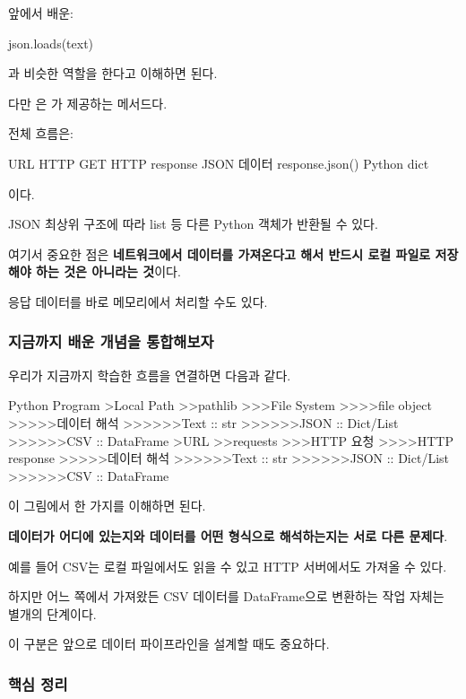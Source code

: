 앞에서 배운:

\begin{dhkcode}
json.loads(text)
\end{dhkcode}

과 비슷한 역할을 한다고 이해하면 된다.

다만 은 가 제공하는 메서드다.

전체 흐름은:

\begin{dhksmry}[centered]
URL
\da
HTTP GET
\da
HTTP response
\da
JSON 데이터
\da
response.json()
\da
Python dict
\end{dhksmry}

이다.

JSON 최상위 구조에 따라 list 등 다른 Python 객체가 반환될 수 있다.

여기서 중요한 점은 \textbf{네트워크에서 데이터를 가져온다고 해서 반드시 로컬 파일로 저장해야 하는 것은 아니라는 것}이다.

응답 데이터를 바로 메모리에서 처리할 수도 있다.

\subsubsection{지금까지 배운 개념을 통합해보자}

우리가 지금까지 학습한 흐름을 연결하면 다음과 같다.

\begin{dhktree}
Python Program
>Local Path
>>pathlib
>>>File System
>>>>file object
>>>>>데이터 해석
>>>>>>Text :: str
>>>>>>JSON :: Dict/List
>>>>>>CSV :: DataFrame
>URL
>>requests
>>>HTTP 요청
>>>>HTTP response
>>>>>데이터 해석
>>>>>>Text :: str
>>>>>>JSON :: Dict/List
>>>>>>CSV :: DataFrame
\end{dhktree}

이 그림에서 한 가지를 이해하면 된다.

\textbf{데이터가 어디에 있는지와 데이터를 어떤 형식으로 해석하는지는 서로 다른 문제다}.

예를 들어 CSV는 로컬 파일에서도 읽을 수 있고 HTTP 서버에서도 가져올 수 있다.

하지만 어느 쪽에서 가져왔든 CSV 데이터를 DataFrame으로 변환하는 작업 자체는 별개의 단계이다.

이 구분은 앞으로 데이터 파이프라인을 설계할 때도 중요하다.

\subsubsection{핵심 정리}

